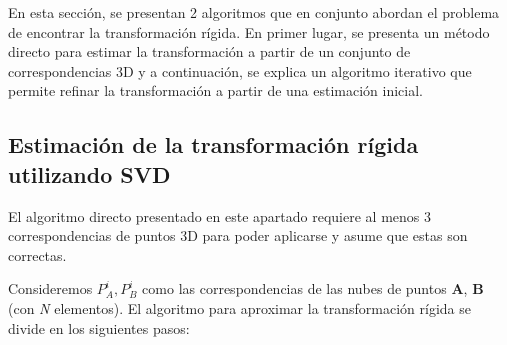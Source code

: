 En esta sección, se presentan 2 algoritmos que en conjunto abordan el problema de encontrar la transformación rígida. En primer lugar, se presenta un método directo para estimar la transformación a partir de un conjunto de correspondencias 3D y a continuación, se explica un algoritmo iterativo que permite refinar la transformación a partir de una estimación inicial.

\subsection{Estimación de la transformación rígida utilizando SVD}
El algoritmo directo presentado en este apartado requiere al menos 3 correspondencias de puntos 3D para poder aplicarse y asume que estas son correctas.

Consideremos $P_{A}^{i}, P_{B}^{i}$ como las correspondencias de las nubes de puntos \textbf{A}, \textbf{B} (con \textit{N} elementos).
El algoritmo para aproximar la transformación rígida se divide en los siguientes pasos:
